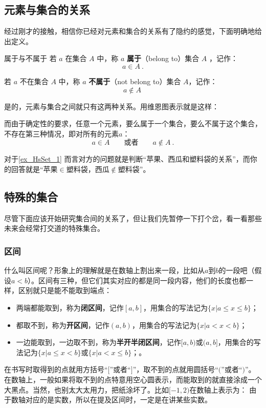 \subsection{元素与集合的关系}

经过刚才的接触，相信你已经对元素和集合的关系有了隐约的感觉，下面明确地给出定义。

\begin{definition}{属于与不属于}
若 $a$ 在集合 $A$ 中，称 $a$ \textbf{属于}（belong to）集合 $A$ ，记作：
\begin{equation}
a \in A~.
\end{equation}

若 $a$ 不在集合 $A$ 中，称 $a$ \textbf{不属于}（not belong to）集合 $A$，记作：
\begin{equation}
a\notin A~
\end{equation}
\end{definition}
是的，元素与集合之间就只有这两种关系。用维恩图表示就是这样：

而由于确定性的要求，任意一个元素，要么属于一个集合，要么不属于这个集合，不存在第三种情况，即对所有的元素$a$：
\begin{equation}
a\in A\qquad\text{或者}\qquad a\not\in A~.
\end{equation}

对于\autoref{ex_HsSet_1} 而言对方的问题就是判断“苹果、西瓜和塑料袋的关系”，而你的回答就是“苹果$\in$塑料袋，西瓜$\notin$塑料袋”。

\subsection{特殊的集合}\label{sub_HsSet_2}

尽管下面应该开始研究集合间的关系了，但让我们先暂停一下打个岔，看一看那些未来会经常打交道的特殊集合。

\subsubsection{区间}

什么叫区间呢？形象上的理解就是在数轴上割出来一段，比如从$a$到$b$的一段吧（假设$a<b$）。区间有三种，但它们其实对应的都是同一段内容，他们的长度也都一样，区别就只是能不能取到端点：
\begin{itemize}
\item 两端都能取到，称为\textbf{闭区间}，记作$[a,b]$，用集合的写法记为$\{x|a\leq x\leq b\}$；
\item 都取不到，称为\textbf{开区间}，记作$(a,b)$，用集合的写法记为$\{x|a< x<b\}$；
\item 一边能取到，一边取不到，称为\textbf{半开半闭区间}，记作$[a,b)$或$(a,b]$，用集合的写法记为$\{x|a\leq x< b\}$或$\{x|a< x\leq b\}$；。
\end{itemize}
在书写时取得到的点就用方括号“$[$”或者“$]$”，取不到的点就用圆括号“$($”或者“$)$”。
在数轴上，一般如果将取不到的点特意用空心圆表示，而能取到的就直接涂成一个大黑点。当然，也别太大太用力，把纸涂坏了。比如$[-1,2)$在数轴上表示为：
\addTODO{画个数轴的图，[-1,2)的区间}
由于数轴对应的是实数，所以在提及区间时，一定是在讲某些实数。


